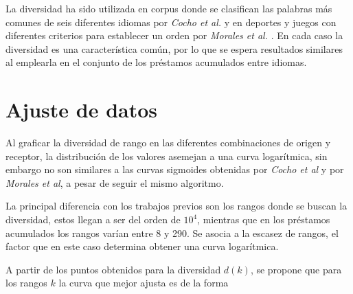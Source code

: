 La diversidad ha sido utilizada en corpus donde se clasifican las palabras más comunes de seis diferentes idiomas  por \textit{Cocho et al.} \cite{iplosone} y en  deportes y juegos  con diferentes criterios para establecer un orden por \textit{Morales et al.} \cite{epj}. En cada caso la diversidad es una característica común, por lo que se espera resultados similares al emplearla en el conjunto de los préstamos acumulados entre idiomas. 
 







\section{Ajuste de datos}

Al graficar la diversidad de rango en las diferentes combinaciones de origen y receptor, la distribución de los valores asemejan a una curva logarítmica, sin embargo no son similares a las curvas sigmoides obtenidas  por \textit{Cocho et al} y  por \textit{Morales et al}, a pesar de seguir el mismo algoritmo.   

La principal diferencia con  los trabajos previos son los rangos donde se buscan la diversidad, estos llegan a ser del orden de $10^{4}$, mientras que en los préstamos acumulados los rangos varían entre 8 y 290. Se asocia a la escasez de rangos, el factor que en este caso determina obtener una curva logarítmica. 

A partir de los puntos obtenidos para la diversidad $d(k)$, se propone que para los rangos $k$ la curva que mejor ajusta es de la forma

